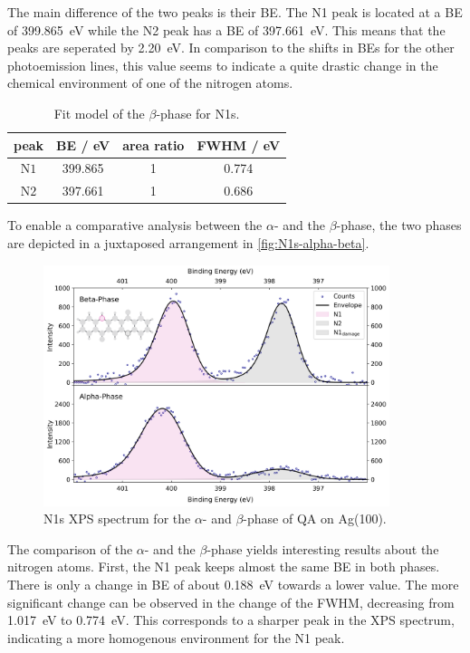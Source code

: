 The main difference of the two peaks is their \ac{BE}. The N1 peak is located at a \ac{BE} of 399.865~\si{\eV} while the N2 peak has a \ac{BE} of 397.661~\si{\eV}. This means that the peaks are seperated by 2.20~\si{\eV}. In comparison to the shifts in \acp{BE} for the other photoemission lines, this value seems to indicate a quite drastic change in the chemical environment of one of the nitrogen atoms.

\begin{table}[H]
	\centering
	\caption{Fit model of the $\beta$-phase for N1s.}
	\begin{tabular}{|c|c|c|c|}
		\hline
		peak & \ac{BE} / eV & area ratio & FWHM / eV \\
		\hline
		$\mathrm{N1}$ & 399.865 & 1 & 0.774\\ \hline
		$\mathrm{N2}$ & 397.661 & 1 & 0.686 \\ \hline
	\end{tabular}
	\label{tab:N1s-beta-fit}
\end{table}

To enable a comparative analysis between the $\alpha$- and the $\beta$-phase, the two phases are depicted in a juxtaposed arrangement in \autoref{fig:N1s-alpha-beta}.

\begin{figure}[H]
	\centering
	\includegraphics[width=0.9\textwidth]{images/N1s-phase-comparison.png}
	\caption{N1s \ac{XPS} spectrum for the $\alpha$- and $\beta$-phase of \ac{QA} on Ag(100).}
	\label{fig:N1s-alpha-beta}
\end{figure}

The comparison of the $\alpha$- and the $\beta$-phase yields interesting results about the nitrogen atoms. First, the N1 peak keeps almost the same \ac{BE} in both phases. There is only a change in \ac{BE} of about 0.188~\si{\eV} towards a lower value. The more significant change can be observed in the change of the \ac{FWHM}, decreasing from 1.017~\si{\eV} to 0.774~\si{\eV}. This corresponds to a sharper peak in the \ac{XPS} spectrum, indicating a more homogenous environment for the N1 peak.

